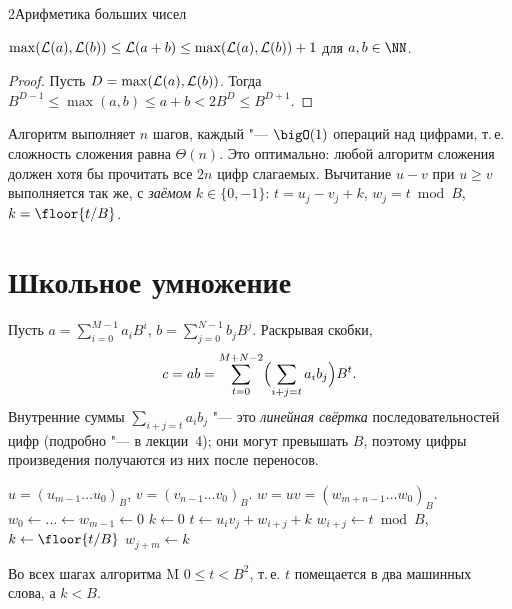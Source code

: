 \begin{lecture}{2}{Арифметика больших чисел}
\begin{proposition}\label{l2:addlen}
$\max(\mathcal{L}(a), \mathcal{L}(b)) \le \mathcal{L}(a + b) \le \max(\mathcal{L}(a), \mathcal{L}(b)) + 1$ для $a, b \in \NN$.
\end{proposition}

\begin{proof}
Пусть $D = \max(\mathcal{L}(a), \mathcal{L}(b))$. Тогда $B^{D-1} \le \max(a, b) \le a + b < 2B^D \le B^{D+1}$.
\end{proof}

Алгоритм выполняет $n$ шагов, каждый "--- $\bigO(1)$ операций над цифрами, т.\,е. сложность
сложения равна $\Theta(n)$. Это оптимально: любой алгоритм сложения должен хотя бы прочитать все
$2n$ цифр слагаемых. Вычитание $u - v$ при $u \ge v$ выполняется так же, с \emph{заёмом}
$k \in \{0, -1\}$: $t = u_j - v_j + k$, $w_j = t \bmod B$, $k = \floor{t/B}$.


\section{Школьное умножение}

Пусть $a = \sum_{i=0}^{M-1} a_i B^i$, $b = \sum_{j=0}^{N-1} b_j B^j$. Раскрывая скобки,
\[
  c = ab = \sum_{t=0}^{M+N-2} \Bigl(\sum_{i + j = t} a_i b_j\Bigr) B^t.
\]
Внутренние суммы $\sum_{i+j=t} a_i b_j$ "--- это \emph{линейная свёртка} последовательностей
цифр (подробно "--- в лекции~4); они могут превышать $B$, поэтому цифры произведения получаются
из них после переносов.

\begin{algorithm}
\begin{algorithmic}[1]
\Require $u = (u_{m-1} \dots u_0)_B$, $v = (v_{n-1} \dots v_0)_B$.
\Ensure $w = uv = (w_{m+n-1} \dots w_0)_B$.
\State $w_0 \gets \dots \gets w_{m-1} \gets 0$
  \State $k \gets 0$
    \State $t \gets u_i v_j + w_{i+j} + k$
    \State $w_{i+j} \gets t \bmod B$, \quad $k \gets \floor{t / B}$
  \EndFor
  \State $w_{j+m} \gets k$
\EndFor
\end{algorithmic}
\end{algorithm}

\begin{lemma}
Во всех шагах алгоритма M $0 \le t < B^2$, т.\,е. $t$ помещается в два машинных слова,
а $k < B$.
\end{lemma}


\end{lecture}
